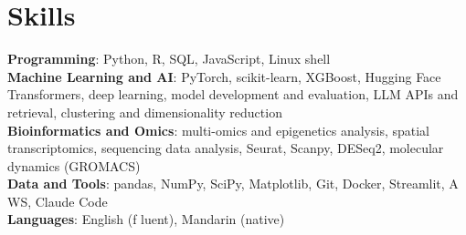 \documentclass[letterpaper,11pt]{article}
\begin{document}
\section{\textbf{Skills}}
 \begin{itemize}[leftmargin=0.15in, label={}]
    \small{\item{
     \textbf{Programming}{: Python, R, SQL, JavaScript, Linux shell} \\
     \textbf{Machine Learning and AI}{: PyTorch, scikit-learn, XGBoost, Hugging Face Transformers, deep learning, model development and evaluation, LLM APIs and retrieval, clustering and dimensionality reduction} \\
     \textbf{Bioinformatics and Omics}{: multi-omics and epigenetics analysis, spatial transcriptomics, sequencing data analysis, Seurat, Scanpy, DESeq2, molecular dynamics (GROMACS)} \\
     \textbf{Data and Tools}{: pandas, NumPy, SciPy, Matplotlib, Git, Docker, Streamlit, A\kern0pt WS, Claude Code} \\
     \textbf{Languages}{: English (f\kern0pt luent), Mandarin (native)}}}

 \end{itemize}
\end{document}
